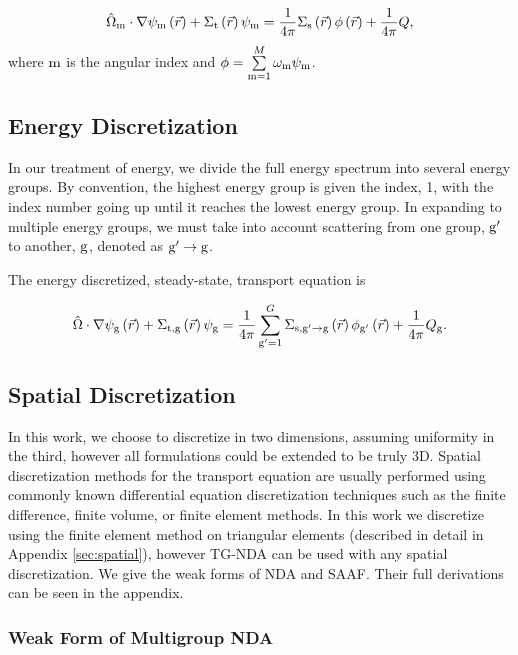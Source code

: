  \begin{equation}
  \hat{\Omega}_{\mathrm{m}} \cdot \nabla \psi_{\mathrm{m}} \left(\vec{r}\right)+ \Sigma_{\mathrm{t}}\left(\vec{r}\right)\psi_{\mathrm{m}} = \frac{1}{4 \pi} \Sigma_{\mathrm{s}}\left(\vec{r}\right) \phi\left(\vec{r}\right) + \frac{1}{4 \pi} Q,
  \label{eq:transport-angular}
 \end{equation}
where $\mathrm{m}$ is the angular index and $\phi = \sum\limits_{\mathrm{m}=1}^M \omega_{\mathrm{m}} \psi_{\mathrm{m}}$.

\subsection{Energy Discretization}
In our treatment of energy, we divide the full energy spectrum into several energy groups. By convention, the highest energy group is given the index, 1, with the index number going up until it reaches the lowest energy group. In expanding to multiple energy groups, we must take into account scattering from one group, $\mathrm{g}'$ to another, $\mathrm{g}$, denoted as $\mathrm{g}' \rightarrow \mathrm{g} $. 

The energy discretized, steady-state, transport equation is

 \begin{equation}
  \hat{\Omega} \cdot \nabla \psi_{\mathrm{g}} \left(\vec{r}\right)+ \Sigma_{\mathrm{t}, \mathrm{g}}\left(\vec{r}\right)\psi_{\mathrm{g}} = \frac{1}{4 \pi} \sum\limits_{\mathrm{g}'=1}^{G}\Sigma_{\mathrm{s}, \mathrm{g}' \rightarrow \mathrm{g}}\left(\vec{r}\right) \phi_{\mathrm{g}'}\left(\vec{r}\right) + \frac{1}{4 \pi} Q_{\mathrm{g}}.
  \label{eq:transport-energy}
 \end{equation}


\subsection{Spatial Discretization}
In this work, we choose to discretize in two dimensions, assuming uniformity in the third, however all formulations could be extended to be truly 3D. Spatial discretization methods for the transport equation are usually performed using commonly known differential equation discretization techniques such as the finite difference, finite volume, or finite element methods. In this work we discretize using the finite element method on triangular elements (described in detail in Appendix \ref{sec:spatial}), however TG-NDA can be used with any spatial discretization. We give the weak forms of NDA and SAAF. Their full derivations can be seen in the appendix. 



\subsubsection{Weak Form of Multigroup NDA}

